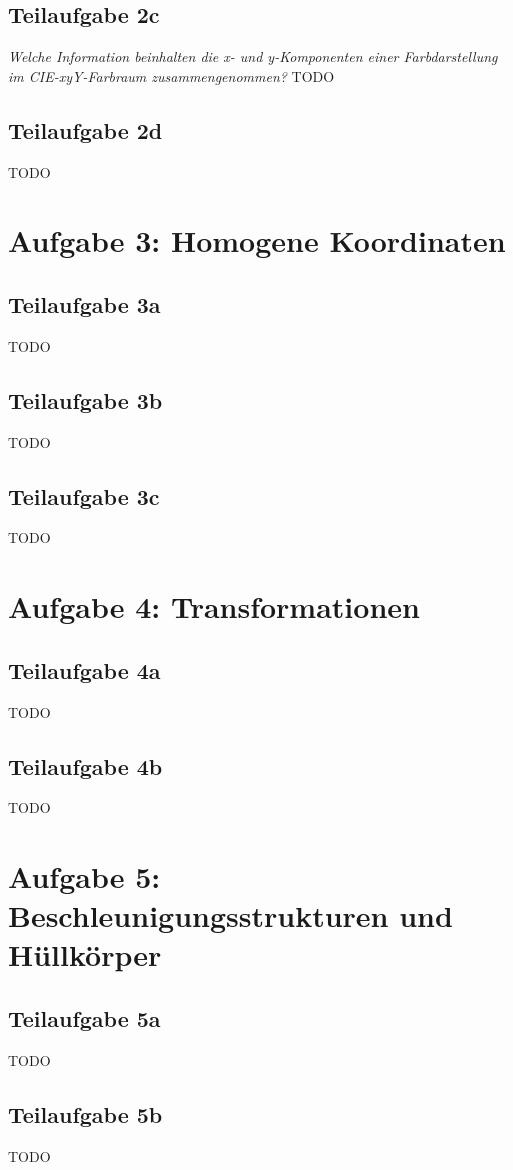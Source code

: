 \documentclass[a4paper]{scrartcl}
\begin{document}
\subsection*{Teilaufgabe 2c}
\textit{Welche Information beinhalten die x- und y-Komponenten einer Farbdarstellung im CIE-xyY-Farbraum zusammengenommen?}
TODO

\subsection*{Teilaufgabe 2d}
TODO

\section*{Aufgabe 3: Homogene Koordinaten}
\subsection*{Teilaufgabe 3a}
TODO
\subsection*{Teilaufgabe 3b}
TODO
\subsection*{Teilaufgabe 3c}
TODO

\section*{Aufgabe 4: Transformationen}
\subsection*{Teilaufgabe 4a}
TODO
\subsection*{Teilaufgabe 4b}
TODO

\section*{Aufgabe 5: Beschleunigungsstrukturen und Hüllkörper}
\subsection*{Teilaufgabe 5a}
TODO
\subsection*{Teilaufgabe 5b}
TODO
\end{document}
